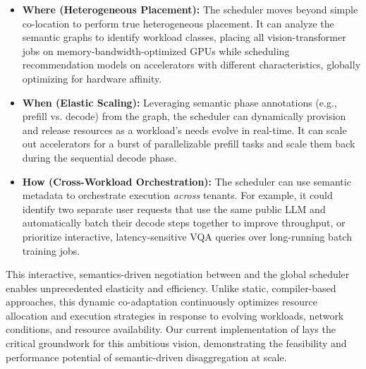 \begin{itemize}[left=0pt]
    \item \textbf{Where (Heterogeneous Placement):} The scheduler mo\-ves beyond simple co-location to perform true heterogeneous placement. It can analyze the semantic graphs to identify workload classes, placing all vision-transformer jobs on memory-bandwidth-optimized GPUs while scheduling recommendation models on accelerators with different characteristics, globally optimizing for hardware affinity.
    
    \item \textbf{When (Elastic Scaling):} Leveraging semantic phase annotations (e.g., prefill vs. decode) from the graph, the scheduler can dynamically provision and release resources as a workload's needs evolve in real-time. It can scale out accelerators for a burst of parallelizable prefill tasks and scale them back during the sequential decode phase.
    
    \item \textbf{How (Cross-Workload Orchestration):} The scheduler can use semantic metadata to orchestrate execution \textit{across} tenants. For example, it could identify two separate user requests that use the same public LLM and automatically batch their decode steps together to improve throughput, or prioritize interactive, latency-sensitive VQA queries over long-running batch training jobs.
\end{itemize}

This interactive, semantics-driven negotiation between \sys and the global scheduler enables unprecedented elasticity and efficiency. 
Unlike static, compiler-based approaches, this dynamic co-adaptation continuously optimizes resource allocation and execution strategies in response to evolving workloads, network conditions, and resource availability. 
Our current implementation of \sys lays the critical groundwork for this ambitious vision, demonstrating the feasibility and performance potential of semantic-driven disaggregation at scale.
